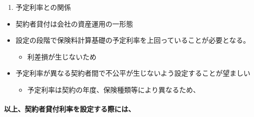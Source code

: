 \documentclass[
]{article}
\providecommand{\tightlist}{%
  \setlength{\itemsep}{0pt}\setlength{\parskip}{0pt}}
\begin{document}
\begin{enumerate}
\def\labelenumi{\arabic{enumi}.}
\setcounter{enumi}{1}
\tightlist
\item
  予定利率との関係
\end{enumerate}

\begin{itemize}
\tightlist
\item
  契約者貸付は会社の資産運用の一形態
\item
  設定の段階で保険料計算基礎の予定利率を上回っていることが必要となる。

  \begin{itemize}
  \tightlist
  \item
    利差損が生じないため
  \end{itemize}
\item
  予定利率が異なる契約者間で不公平が生じないよう設定することが望ましい

  \begin{itemize}
  \tightlist
  \item
    予定利率は契約の年度、保険種類等により異なるため、
  \end{itemize}
\end{itemize}

\hypertarget{ux4ee5ux4e0aux5951ux7d04ux8005ux8cb8ux4ed8ux5229ux7387ux3092ux8a2dux5b9aux3059ux308bux969bux306bux306f}{%
\paragraph{以上、契約者貸付利率を設定する際には、}\label{ux4ee5ux4e0aux5951ux7d04ux8005ux8cb8ux4ed8ux5229ux7387ux3092ux8a2dux5b9aux3059ux308bux969bux306bux306f}}
\end{document}
